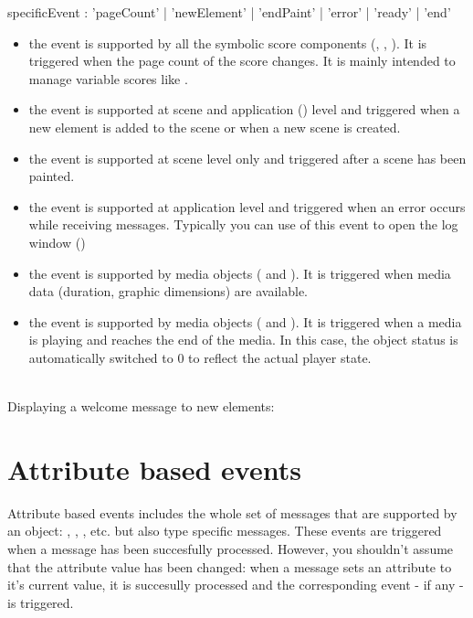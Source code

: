 \documentclass[a4paper,twoside]{report}
\newcommand{\sublevel}[1]	{\section{#1}}
\begin{document}
\begin{rail}
specificEvent : 	  'pageCount'
		| 'newElement'
		| 'endPaint'
		| 'error'
		| 'ready'
		| 'end'
\end{rail}

\begin{itemize}
\item the  event is supported by all the symbolic score components (, , ). It is triggered when the page count of the score changes. It is mainly intended to manage variable scores like .
\item the  event is supported at scene and application () level and triggered when a new element is added to the scene or when a new scene is created.
\item the  event is supported at scene level only and triggered after a scene has been painted.
\item the  event is supported at application level and triggered when an error occurs while receiving messages. 
Typically you can use of this event to open the log window () 
\item the  event is supported by media objects ( and ). It is triggered when media data (duration, graphic dimensions) are available.
\item the  event is supported by media objects ( and ). It is triggered when a media is playing and reaches the end of the media. In this case, the object  status is automatically switched to 0 to reflect the actual player state.
\end{itemize}

\example \\
Displaying a welcome message to new elements:

\sublevel{Attribute based events}
\label{attributeevents}

Attribute based events includes the whole set of messages that are supported by an object: , , , etc. but also type specific messages. These events are triggered when a message has been succesfully processed. However, you shouldn't assume that the attribute value has been changed: when a message sets an attribute to it's current value, it is succesully processed and the corresponding event - if any - is triggered. 
\end{document}
